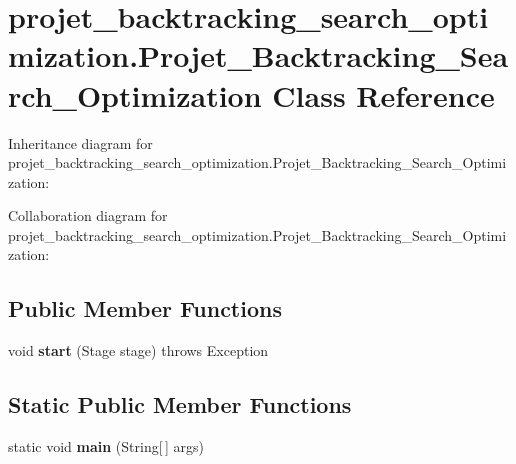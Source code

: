 \hypertarget{classprojet__backtracking__search__optimization_1_1_projet___backtracking___search___optimization}{}\section{projet\+\_\+backtracking\+\_\+search\+\_\+optimization.\+Projet\+\_\+\+Backtracking\+\_\+\+Search\+\_\+\+Optimization Class Reference}
\label{classprojet__backtracking__search__optimization_1_1_projet___backtracking___search___optimization}


Inheritance diagram for projet\+\_\+backtracking\+\_\+search\+\_\+optimization.\+Projet\+\_\+\+Backtracking\+\_\+\+Search\+\_\+\+Optimization\+:


Collaboration diagram for projet\+\_\+backtracking\+\_\+search\+\_\+optimization.\+Projet\+\_\+\+Backtracking\+\_\+\+Search\+\_\+\+Optimization\+:
\subsection*{Public Member Functions}
\begin{DoxyCompactItemize}
\item 
\mbox{\label{classprojet__backtracking__search__optimization_1_1_projet___backtracking___search___optimization_a8cc74f9f8fab054025e00defd4d0dd7b}} 
void {\bfseries start} (Stage stage)  throws Exception 
\end{DoxyCompactItemize}
\subsection*{Static Public Member Functions}
\begin{DoxyCompactItemize}
\item 
\mbox{\label{classprojet__backtracking__search__optimization_1_1_projet___backtracking___search___optimization_a169c97de6c7d1f2ef63d7afd10f2b4c6}} 
static void {\bfseries main} (String\mbox{[}$\,$\mbox{]} args)
\end{DoxyCompactItemize}


